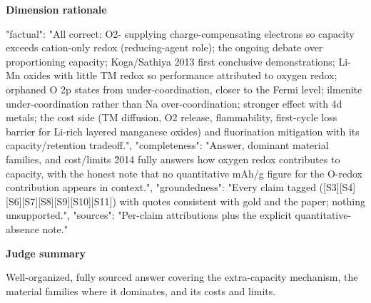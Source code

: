 \documentclass[10pt]{article}
\begin{document}
\textbf{Dimension rationale}
\begin{EvidenceText}
{
  "factual": "All correct: O2- supplying charge-compensating electrons so capacity exceeds cation-only redox (reducing-agent role); the ongoing debate over proportioning capacity; Koga/Sathiya 2013 first conclusive demonstrations; Li-Mn oxides with little TM redox so performance attributed to oxygen redox; orphaned O 2p states from under-coordination, closer to the Fermi level; ilmenite under-coordination rather than Na over-coordination; stronger effect with 4d metals; the cost side (TM diffusion, O2 release, flammability, first-cycle loss barrier for Li-rich layered manganese oxides) and fluorination mitigation with its capacity/retention tradeoff.",
  "completeness": "Answer, dominant material families, and cost/limits \u2014 fully answers how oxygen redox contributes to capacity, with the honest note that no quantitative mAh/g figure for the O-redox contribution appears in context.",
  "groundedness": "Every claim tagged ([S3][S4][S6][S7][S8][S9][S10][S11]) with quotes consistent with gold and the paper; nothing unsupported.",
  "sources": "Per-claim attributions plus the explicit quantitative-absence note."
}
\end{EvidenceText}

\textbf{Judge summary}
\begin{EvidenceText}
Well-organized, fully sourced answer covering the extra-capacity mechanism, the material families where it dominates, and its costs and limits.
\end{EvidenceText}
\end{document}
